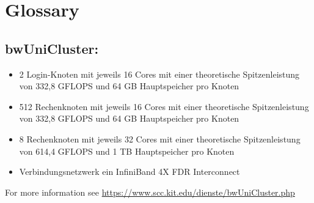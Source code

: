 \section{Glossary}
	\hypertarget{bwUniCluster}{}	
	\subsection{bwUniCluster:}
	\begin{itemize}
		\item{2 Login-Knoten mit jeweils 16 Cores mit einer theoretische Spitzenleistung von 332,8 GFLOPS und 64 GB Hauptspeicher pro Knoten}
		\item{512 Rechenknoten mit jeweils 16 Cores mit einer theoretische Spitzenleistung von 332,8 GFLOPS und 64 GB Hauptspeicher pro Knoten}
		\item{8 Rechenknoten mit jeweils 32 Cores mit einer theoretische Spitzenleistung von 614,4 GFLOPS und 1 TB Hauptspeicher pro Knoten}
		\item{Verbindungsnetzwerk ein InfiniBand 4X FDR Interconnect}
	\end{itemize}
	For more information see \href{https://www.scc.kit.edu/dienste/bwUniCluster.php}{https://www.scc.kit.edu/dienste/bwUniCluster.php}
    